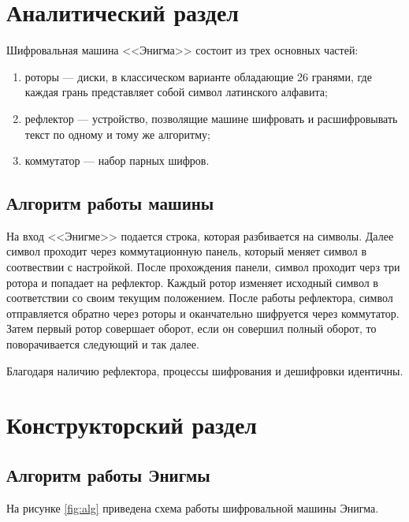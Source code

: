 \chapter{Аналитический раздел}

Шифровальная машина <<Энигма>> состоит из трех основных частей:
\begin{enumerate}
    \item роторы --- диски, в классическом варианте обладающие 26 гранями, где каждая грань представляет собой символ латинского алфавита;
    \item рефлектор --- устройство, позволящие машине шифровать и расшифровывать текст по одному и тому же алгоритму;
    \item коммутатор --- набор парных шифров.
\end{enumerate}

\section{Алгоритм работы машины}

На вход <<Энигме>> подается строка, которая разбивается на символы. 
Далее символ проходит через коммутационную панель, который меняет символ в соотвествии с настройкой.
После прохождения панели, символ проходит черз три ротора и попадает на рефлектор.
Каждый ротор изменяет исходный символ в соответствии со своим текущим положением.
После работы рефлектора, символ отправляется обратно через роторы и оканчательно шифруется через коммутатор.
Затем первый ротор совершает оборот, если он совершил полный оборот, то поворачивается следующий и так далее.

Благодаря наличию рефлектора, процессы шифрования и дешифровки идентичны.

\chapter{Конструкторский раздел}

\section{Алгоритм работы Энигмы}

На рисунке \ref{fig:alg} приведена схема работы шифровальной машины Энигма.

